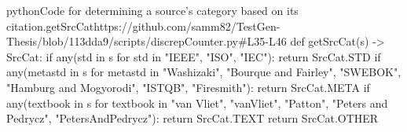 \begin{codeSnippet}{python}{Code for determining a source's category based on its citation.}{getSrcCat}{https://github.com/samm82/TestGen-Thesis/blob/113dda9/scripts/discrepCounter.py\#L35-L46}
def getSrcCat(s) -> SrcCat:
    if any(std in s for std in {"IEEE", "ISO", "IEC"}):
        return SrcCat.STD
    if any(metastd in s for metastd in
        {"Washizaki", "Bourque and Fairley", "SWEBOK",
            "Hamburg and Mogyorodi", "ISTQB", "Firesmith"}):
        return SrcCat.META
    if any(textbook in s for textbook in
        {"van Vliet", "vanVliet", "Patton", "Peters and Pedrycz",
            "PetersAndPedrycz"}):
        return SrcCat.TEXT
    return SrcCat.OTHER
\end{codeSnippet}

\mainInvalidInputTest{}

\projViolationChoice{}

\projManualViolationReq{}

\exampleCode{}

\examplePseudocode{}
